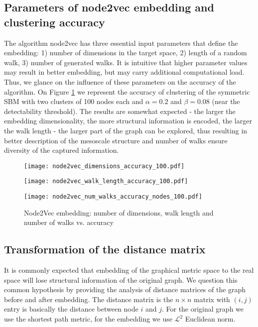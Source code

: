 \subsection{Parameters of node2vec embedding and clustering accuracy}
The algorithm node2vec has three essential input parameters that define the embedding: 1) number of dimensions in the target space, 2) length of a random walk, 3) number of generated walks. It is intuitive that higher parameter values may result in better embedding, but may carry additional computational load. Thus, we glance on the influence of these parameters on the accuracy of the algorithm. On Figure \ref{fig.params_node2vec} we represent the accuracy of clustering of the symmetric SBM with two clusters of 100 nodes each and $\alpha=0.2$ and $\beta = 0.08$ (near the detectability threshold). The results are somewhat expected - the larger the embedding dimensionality, the more structural information is encoded, the larger the walk length - the larger part of the graph can be explored, thus resulting in better description of the mesoscale structure and number of walks ensure diversity of the captured information.
\begin{figure}[ht]
\centering
\begin{minipage}[b]{0.32\textwidth}
\centering
\texttt{[image: node2vec\_dimensions\_accuracy\_100.pdf]}
\end{minipage}\hfill
\begin{minipage}[b]{0.32\textwidth}
\centering
\texttt{[image: node2vec\_walk\_length\_accuracy\_100.pdf]}
\end{minipage}\hfill
\begin{minipage}[b]{0.32\textwidth}
\centering
\texttt{[image: node2vec\_num\_walks\_accuracy\_nodes\_100.pdf]}
\end{minipage}
\caption{Node2Vec embedding: number of dimensions, walk length and number of walks vs. accuracy}
\label{fig.params_node2vec}
\end{figure}

\subsection{Transformation of the distance matrix}
It is commonly expected that embedding of the graphical metric space to the real space will lose structural information of the original graph. We question this common hypothesis by providing the analysis of distance matrices of the graph before and after embedding. The distance matrix is the $n\times n$ matrix with $(i,j)$ entry is basically the distance between node $i$ and $j$. For the original graph we use the shortest path metric, for the embedding we use $\mathcal{L}^2$ Euclidean norm. 

